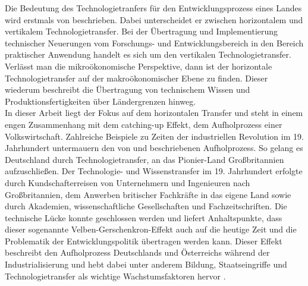 Die Bedeutung des Technologietranfers für den Entwicklungsprozess eines Landes wird erstmals von \cite{Gerschenkron.1962} beschrieben. Dabei unterscheidet er zwischen horizontalem und vertikalem Technologietransfer. Bei der Übertragung und Implementierung technischer Neuerungen vom Forschungs- und Entwicklungsbereich in den Bereich praktischer Anwendung handelt es sich um den vertikalen Technologietransfer. Verlässt man die mikroökonomische Perspektive, dann ist der horizontale Technologietransfer auf der makroökonomischer Ebene zu finden. Dieser wiederum beschreibt die Übertragung von technischem Wissen und Produktionsfertigkeiten über Ländergrenzen hinweg.\\ In dieser Arbeit liegt der Fokus auf dem horizontalen Transfer und steht in einem engen Zusammenhang mit dem catching-up Effekt, dem Aufholprozess einer Volkswirtschaft. Zahlreiche Beispiele zu Zeiten der industriellen Revolution im 19. Jahrhundert untermauern den von \cite{Gerschenkron.1962} und \cite{Veblen.1915} beschriebenen Aufholprozess. So gelang es Deutschland durch Technologietransfer, an das Pionier-Land Großbritannien aufzuschließen. Der Technologie- und Wissenstransfer im 19. Jahrhundert erfolgte durch Kundschafterreisen von Unternehmern und Ingenieuren nach Großbritannien, dem Anwerben britischer Fachkräfte in das eigene Land sowie durch Akademien, wissenschaftliche Gesellschaften und Fachzeitschriften. Die technische Lücke konnte geschlossen werden und liefert Anhaltspunkte, dass dieser sogenannte Velben-Gerschenkron-Effekt auch auf die heutige Zeit und die Problematik der Entwicklungspolitik übertragen werden kann. Dieser Effekt beschreibt den Aufholprozess Deutschlands und Österreichs während der Industrialisierung und hebt dabei unter anderem Bildung, Staatseingriffe und Technologietransfer als wichtige Wachstumsfaktoren hervor \cite[S. 18-19]{Peri.2004}. \\
%
